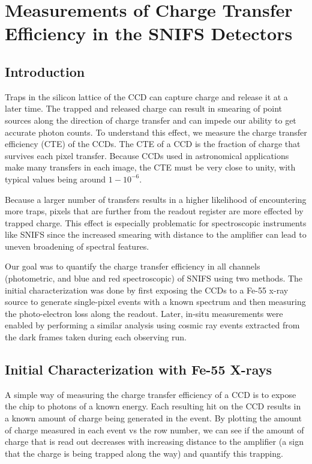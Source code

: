 \chapter{Measurements of Charge Transfer Efficiency in the SNIFS Detectors}

\section{Introduction}
Traps in the silicon lattice of the CCD can capture charge and release it at a later time. The trapped and released charge can result in smearing of point sources along the direction of charge transfer and can impede our ability to get accurate photon counts. To understand this effect, we measure the charge transfer efficiency (CTE) of the CCDs. The CTE of a CCD is the fraction of charge that survives each pixel transfer. Because CCDs used in astronomical applications make many transfers in each image, the CTE must be very close to unity, with typical values being around $1-10^{-6}$.

Because a larger number of transfers results in a higher likelihood of encountering more traps, pixels that are further from the readout register are more effected by trapped charge. This effect is especially problematic for spectroscopic instruments like SNIFS since the increased smearing with distance to the amplifier can lead to uneven broadening of spectral features.

Our goal was to quantify the charge transfer efficiency in all channels (photometric, and blue and red spectroscopic) of SNIFS using two methods. The initial characterization was done by first exposing the CCDs to a Fe-55 x-ray source to generate single-pixel events with a known spectrum and then measuring the photo-electron loss along the readout. Later, in-situ measurements were enabled by performing a similar analysis using cosmic ray events extracted from the dark frames taken during each observing run.

\section{Initial Characterization with Fe-55 X-rays}
A simple way of measuring the charge transfer efficiency of a CCD is to expose the chip to photons of a known energy. Each resulting hit on the CCD results in a known amount of charge being generated in the event. By plotting the amount of charge measured in each event vs the row number, we can see if the amount of charge that is read out decreases with increasing distance to the amplifier (a sign that the charge is being trapped along the way) and quantify this trapping.

